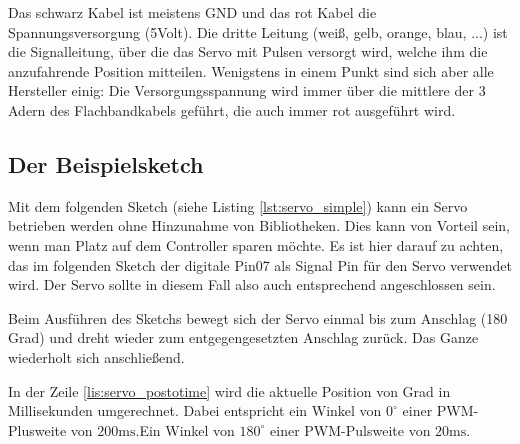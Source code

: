 Das schwarz Kabel ist meistens GND und das rot Kabel  die Spannungsversorgung (5Volt). Die dritte Leitung (weiß, gelb, orange, blau, ...) ist die Signalleitung, über die das Servo mit Pulsen versorgt wird, welche ihm die anzufahrende Position mitteilen. Wenigstens in einem Punkt sind sich aber alle Hersteller einig: Die Versorgungsspannung wird immer über die mittlere der 3 Adern des Flachbandkabels geführt, die auch immer rot ausgeführt wird.


\subsection{Der Beispielsketch}

Mit dem folgenden Sketch (siehe Listing \ref{lst:servo_simple}) kann ein Servo betrieben werden ohne Hinzunahme von Bibliotheken. Dies kann von Vorteil sein, wenn man Platz auf dem Controller sparen möchte. Es ist hier darauf zu achten, das im folgenden Sketch der digitale Pin07 als Signal Pin für den Servo verwendet wird. Der Servo sollte in diesem Fall also auch entsprechend  angeschlossen sein.

Beim Ausführen des Sketchs bewegt sich der Servo einmal bis zum Anschlag (180 Grad) und dreht wieder zum entgegengesetzten Anschlag zurück. Das Ganze wiederholt sich anschließend.

In der Zeile \ref{lis:servo_postotime} wird die aktuelle Position von Grad in Millisekunden umgerechnet. Dabei entspricht ein Winkel von $0^\circ$ einer PWM-Plusweite von $200\text{ms}$.Ein Winkel von $180^\circ$ einer PWM-Pulsweite von $20\text{ms}$.

